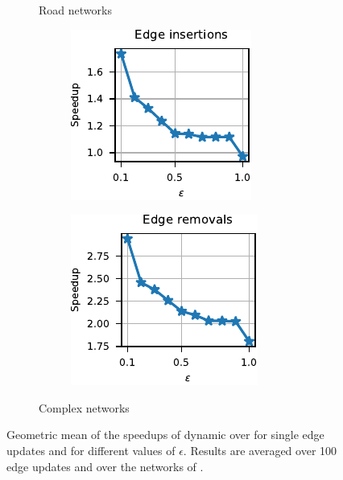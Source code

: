 \begin{figure}[t]
\begin{subfigure}[b]{.5\textwidth}
\begin{subfigure}[b]{.5\textwidth}
\end{subfigure}
\caption{Road networks}
\label{fig:dyn-mwm:rw-speed-road}
\end{subfigure}\hfill
\begin{subfigure}[b]{.5\textwidth}
\begin{subfigure}[b]{.5\textwidth}
\centering
\includegraphics[width=.9\textwidth]{sources/plots/dyn-mwm/rw-insertion-cplx-speed.pdf}
\end{subfigure}\hfill
\begin{subfigure}[b]{.5\textwidth}
\centering
\includegraphics[width=.9\textwidth]{sources/plots/dyn-mwm/rw-removal-cplx-speed.pdf}
\end{subfigure}
\caption{Complex networks}
\label{fig:dyn-mwm:rw-speed-cplx}
\end{subfigure}
\caption{Geometric mean of the speedups of dynamic \suitor over
\dynmwmrandom for single edge updates and for different values of $\epsilon$.
Results are averaged over 100 edge updates and over the networks of
.}
\label{fig:dyn-mwm:rw-speed-real-world}
\end{figure}

